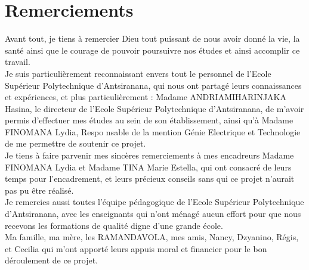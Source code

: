 
\chapter*{Remerciements}
	
Avant tout, je tiens à remercier Dieu tout puissant de nous avoir donné la vie, la santé ainsi que le courage de pouvoir poursuivre nos études et ainsi accomplir ce travail.\\[1cm] Je suis particulièrement reconnaissant envers tout le personnel de l’Ecole Supérieur Polytechnique d’Antsiranana, qui nous ont partagé leurs connaissances et expériences, et plus particulièrement :
Madame ANDRIAMIHARINJAKA Hasina, le directeur de l’Ecole Supérieur Polytechnique d’Antsiranana, de
m’avoir permis d’effectuer mes études au sein de son établissement, ainsi qu’à Madame FINOMANA Lydia, Respo nsable de la  mention Génie Electrique et Technologie de me permettre de soutenir ce projet.\\[1cm]
Je tiens à faire parvenir mes sincères remerciements à mes encadreurs Madame FINOMANA Lydia et Madame TINA Marie Estella, qui ont consacré de leurs temps pour l'encadrement, et leurs précieux conseils sans qui ce projet n’aurait pas pu être réalisé.
\\[1cm]
Je remercies aussi toutes l’équipe pédagogique de l’Ecole Supérieur Polytechnique d’Antsiranana, avec les enseignants qui n’ont ménagé aucun effort pour que nous recevons les formations de qualité digne d’une grande école.\\[1cm]
Ma famille, ma mère, les RAMANDAVOLA, mes amis, Nancy, Dzyanino, Régis, et Cecilia qui m'ont apporté leurs appuis moral et financier pour le bon déroulement de ce projet.


\setcounter{page}{1}







